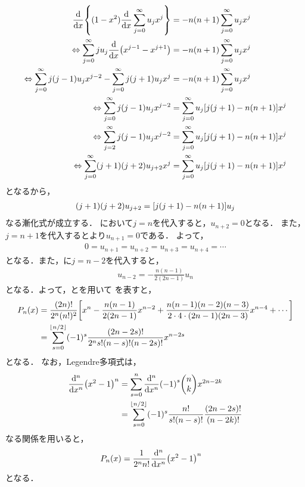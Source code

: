 \documentclass{report}
\begin{document}
      \begin{align}
        \dv{x}\qty{(1 - x^2)\dv{x}\sum_{j = 0}^{\infty}u_jx^j} &= -n(n + 1)\sum_{j = 0}^{\infty}u_jx^j \\ 
        \Leftrightarrow \sum_{j = 0}^{\infty}ju_j\dv{x}\qty(x^{j - 1} - x^{j + 1}) &= -n(n + 1)\sum_{j = 0}^{\infty}u_jx^j \\ 
        \Leftrightarrow \sum_{j = 0}^{\infty}j(j - 1)u_jx^{j - 2} - \sum_{j = 0}^{\infty}j(j + 1)u_jx^j &= -n(n + 1)\sum_{j = 0}^{\infty}u_jx^j \\ 
        \Leftrightarrow \sum_{j = 0}^{\infty}j(j - 1)u_jx^{j - 2} &= \sum_{j = 0}^{\infty}u_j\qty[j(j + 1) - n(n + 1)]x^j \\ 
        \Leftrightarrow \sum_{j = 2}^{\infty}j(j - 1)u_jx^{j - 2} &= \sum_{j = 0}^{\infty}u_j\qty[j(j + 1) - n(n + 1)]x^j \\ 
        \Leftrightarrow \sum_{j = 0}^{\infty}(j + 1)(j + 2)u_{j + 2}x^{j} &= \sum_{j = 0}^{\infty}u_j\qty[j(j + 1) - n(n + 1)]x^j 
      \end{align}
      となるから，
      \begin{align}
        (j + 1)(j + 2)u_{j + 2} = \qty[j(j + 1) - n(n + 1)]u_j\label{legendre-polynominal-u-expantion-recurr}
      \end{align}
      なる漸化式が成立する．
      において$j = n$を代入すると，$u_{n + 2} = 0$となる．
      また，$j = n + 1$を代入するとより$u_{n + 1} = 0$である．
      よって，
      \begin{align}
        0 = u_{n + 1} = u_{n + 2} = u_{n + 3} = u_{n + 4} = \cdots 
      \end{align}
      となる．また，に$j = n - 2$を代入すると，
      \begin{align}
        u_{n - 2} = -\frac{n(n - 1)}{2(2n - 1)}u_n\label{legendre-polynominal-u-expantion-recurr-2}
      \end{align}
      となる．よって，とを用いて
      を表すと，
      \begin{align}
        P_n(x) &= \frac{(2n)!}{2^n(n!)^2}\qty[x^n - \frac{n(n - 1)}{2(2n - 1)}x^{n - 2} + \frac{n(n - 1)(n - 2)(n - 3)}{2\cdot 4\cdot (2n - 1)(2n - 3)}x^{n - 4} + \cdots] \\ 
        &= \sum_{s = 0}^{\lfloor n/2 \rfloor}(-1)^s \frac{(2n - 2s)!}{2^ns!(n - s)!(n - 2s)!}x^{n - 2s}
      \end{align}
      となる．
      なお，Legendre多項式は，
      \begin{align}
        \dv[n]{x}\qty(x^2 - 1)^n &= \sum_{s = 0}^{n}\dv[n]{x}(-1)^s\mqty(n \\ k)x^{2n - 2k} \\ 
        &= \sum_{s = 0}^{\lfloor n/2 \rfloor}(-1)^s\frac{n!}{s!(n - s)!}\frac{(2n - 2s)!}{(n - 2k)!}
      \end{align}
      なる関係を用いると，
      \begin{align}
        P_n(x) &= \frac{1}{2^nn!}\dv[n]{x}\qty(x^2 - 1)^n\label{legendre-pn-easy}
      \end{align}
      となる．
\end{document}
